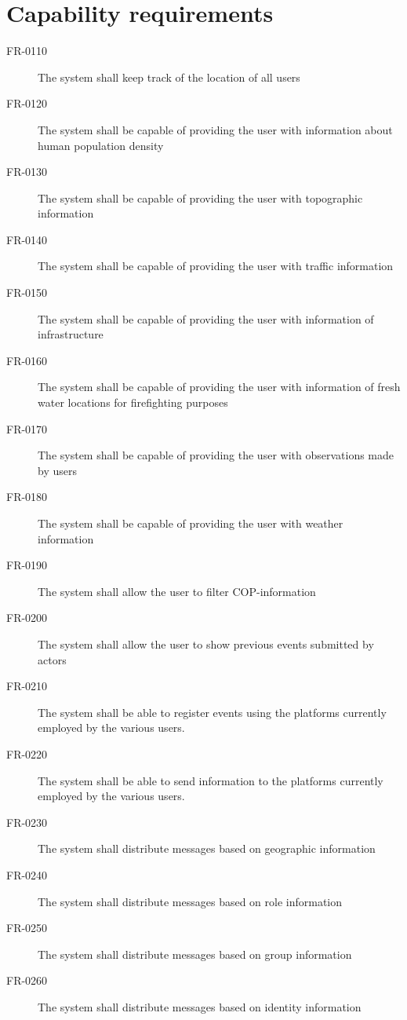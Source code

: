 \section{Capability requirements}

\begin{description}
  \item[FR-0110] The system shall keep track of the location of all users 
  \item[FR-0120] The system shall be capable of providing the user with information about human population density
  \item[FR-0130] The system shall be capable of providing the user with topographic information
  \item[FR-0140] The system shall be capable of providing the user with traffic information
  \item[FR-0150] The system shall be capable of providing the user with information of infrastructure
  \item[FR-0160] The system shall be capable of providing the user with information of fresh water locations for firefighting purposes
 \item[FR-0170] The system shall be capable of providing the user with observations made by users
\item[FR-0180] The system shall be capable of providing the user with weather information
\item[FR-0190] The system shall allow the user to filter COP-information
\item[FR-0200] The system shall allow the user to show previous events submitted by actors
\item[FR-0210] The system shall be able to register events using the platforms currently employed by the various users.
\item[FR-0220] The system shall be able to send information to the platforms currently employed by the various users.
\item[FR-0230] The system shall distribute messages based on geographic information
\item[FR-0240] The system shall distribute messages based on role information
\item[FR-0250] The system shall distribute messages based on group information
\item[FR-0260] The system shall distribute messages based on identity information


\end{description}